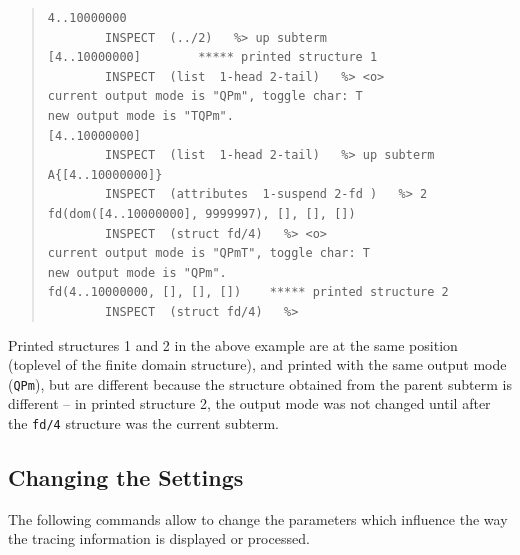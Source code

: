 \begin{descr}{1cm}
\begin{quote}\begin{verbatim}
4..10000000
        INSPECT  (../2)   %> up subterm    
[4..10000000]        ***** printed structure 1
        INSPECT  (list  1-head 2-tail)   %> <o>
current output mode is "QPm", toggle char: T
new output mode is "TQPm".
[4..10000000]
        INSPECT  (list  1-head 2-tail)   %> up subterm
A{[4..10000000]}
        INSPECT  (attributes  1-suspend 2-fd )   %> 2
fd(dom([4..10000000], 9999997), [], [], [])
        INSPECT  (struct fd/4)   %> <o>
current output mode is "QPmT", toggle char: T
new output mode is "QPm".
fd(4..10000000, [], [], [])    ***** printed structure 2
        INSPECT  (struct fd/4)   %>      

\end{verbatim}\end{quote}

Printed structures 1 and 2 in the above example are at the same position
(toplevel of the finite domain structure), and printed with the same output
mode (\verb'QPm'), but are different because the structure obtained from
the parent subterm is different -- in printed structure 2, the output mode
was not changed until after the \verb'fd/4' structure was the current
subterm. 

\end{descr}


\subsection{Changing the Settings}
The following commands allow to change the parameters which
influence the way the tracing information is displayed or processed.

